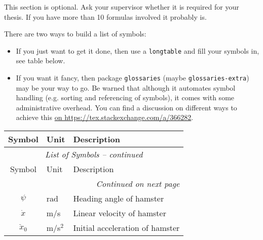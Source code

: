 \cleardoublepage
{}

This section is optional. 
Ask your supervisor whether it is required for your thesis. 
If you have more than 10 formulas involved it probably is.

There are two ways to build a list of symbols:

\begin{itemize}
    \item If you just want to get it done, then use a \texttt{longtable} and fill your symbols in, see table below.
    \item If you want it fancy, then package \texttt{glossaries} (maybe \texttt{glossaries-extra}) may be your way to go. 
    Be warned that although it automates symbol handling (e.g. sorting and referencing of symbols), it comes with some administrative overhead. 
    You can find a discussion on different ways to achieve this \href{https://tex.stackexchange.com/a/366282}{on https://tex.stackexchange.com/a/366282}.
\end{itemize}

\begin{center}
\begin{longtable}{@{}c l p{10cm}@{}}
\toprule
Symbol & Unit & Description \\
\midrule
\endfirsthead
\multicolumn{3}{c}{\textit{List of Symbols -- continued}}\\
\toprule
Symbol & Unit & Description \\
\midrule
\endhead
\bottomrule \multicolumn{3}{r}{\textit{Continued on next page}} \\
\endfoot
\bottomrule
\endlastfoot

\(\psi\) & rad & Heading angle of hamster \\
\(\dot x\) & m/s & Linear velocity of hamster \\
\(\ddot x_0\) & m/s$^2$ & Initial acceleration of hamster \\
\end{longtable}
\end{center}
